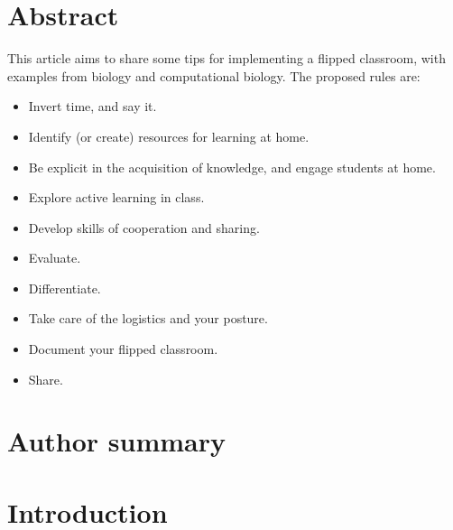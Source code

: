 \documentclass[10pt,letterpaper]{article}
\begin{document}
\section*{Abstract}

This article aims to share some tips for implementing a flipped classroom, with examples from biology and computational biology. 
The proposed rules are:

\begin{itemize}
\item Invert time, and say it.
\item Identify (or create) resources for learning at home.
\item Be explicit in the acquisition of knowledge, and engage students at home.
\item Explore active learning in class.
\item Develop skills of cooperation and sharing.
\item Evaluate.
\item Differentiate.
\item Take care of the logistics and your posture.
\item Document your flipped classroom.
\item Share.
\end{itemize}


\section*{Author summary}

\linenumbers

\section*{Introduction}
\end{document}
